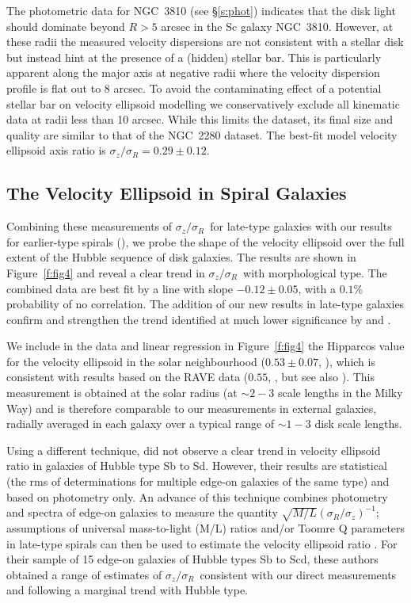 \documentclass[useAMS,usenatbib]{mn2e}
\newcommand{\szsr}{$\sigma_z/\sigma_R$}
\begin{document}
The photometric data for NGC~3810 (see \S\ref{s:phot}) indicates that
the disk light should dominate beyond $R>5$ arcsec in the Sc galaxy
NGC~3810.  However, at these radii the measured velocity dispersions are
not consistent with a stellar disk but instead hint at the presence of a
(hidden) stellar bar.  This is particularly apparent along the major
axis at negative radii where the velocity dispersion profile is flat out
to 8 arcsec.  To avoid the contaminating effect of a potential stellar
bar on velocity ellipsoid modelling we conservatively exclude all
kinematic data at radii less than 10 arcsec.  While this limits the
dataset, its final size and quality are similar to that of the NGC~2280
dataset.  The best-fit model velocity ellipsoid axis ratio is $\sigma_z
/ \sigma_R = 0.29 \pm 0.12$.


\subsection{The Velocity Ellipsoid in Spiral Galaxies}
\label{sec:spirals}

Combining these measurements of \szsr\ for late-type galaxies with our
results for earlier-type spirals (\citealt{Gerssen1997, Gerssen2000,
  Shapiro2003}), we probe the shape of the velocity ellipsoid over the
full extent of the Hubble sequence of disk galaxies.  The results are
shown in Figure~\ref{f:fig4} and reveal a clear trend in \szsr\ with
morphological type.  The combined data are best fit by a line with slope
$-0.12 \pm 0.05$, with a $0.1$\% probability of no correlation.  The
addition of our new results in late-type galaxies confirm and strengthen
the trend identified at much lower significance by \citet{Gerssen2000}
and \citet{Shapiro2003}.

We include in the data and linear regression in Figure~\ref{f:fig4} the
Hipparcos value for the velocity ellipsoid in the solar neighbourhood
($0.53 \pm 0.07$, \citealt{Dehnen1998}), which is consistent with
results based on the RAVE data ($0.55$, \citealt{Casetti2011}, but see
also \citealt{Veltz2008}).  This measurement is obtained at the solar
radius (at $\sim 2-3$ scale lengths in the Milky Way) and is therefore
comparable to our measurements in external galaxies, radially averaged
in each galaxy over a typical range of $\sim 1-3$ disk scale lengths.

Using a different technique, \citet{vdk1999} did not observe a clear
trend in velocity ellipsoid ratio in galaxies of Hubble type Sb to Sd.
However, their results are statistical (the rms of determinations for
multiple edge-on galaxies of the same type) and based on photometry
only.  An advance of this technique combines photometry and spectra of
edge-on galaxies to measure the quantity $\sqrt{M/L}
(\sigma_R/\sigma_z)^{-1}$; assumptions of universal mass-to-light (M/L)
ratios and/or Toomre Q parameters in late-type spirals can then be used
to estimate the velocity ellipsoid ratio \citep{Kregel2005}.  For their
sample of 15 edge-on galaxies of Hubble types Sb to Scd, these authors
obtained a range of estimates of \szsr\ consistent with our direct
measurements and following a marginal trend with Hubble type.
\end{document}
